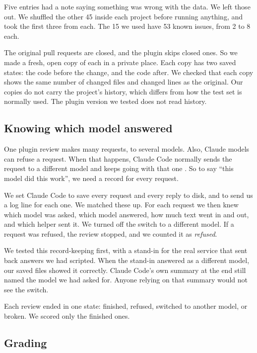 \documentclass[11pt]{article}
\begin{document}
Five entries had a note saying something was wrong with the data. We left those out. We shuffled the other 45 inside each project before running anything, and took the first three from each. The 15 we used have 53 known issues, from 2 to 8 each.

The original pull requests are closed, and the plugin skips closed ones. So we made a fresh, open copy of each in a private place. Each copy has two saved states: the code before the change, and the code after. We checked that each copy shows the same number of changed files and changed lines as the original. Our copies do not carry the project's history, which differs from how the test set is normally used. The plugin version we tested does not read history.

\subsection{Knowing which model answered}

One plugin review makes many requests, to several models. Also, Claude models can refuse a request. When that happens, Claude Code normally sends the request to a different model and keeps going with that one \citep{anthropic2026refusals,anthropic2026modelconfig}. So to say ``this model did this work'', we need a record for every request.

We set Claude Code to save every request and every reply to disk, and to send us a log line for each one. We matched these up. For each request we then knew which model was asked, which model answered, how much text went in and out, and which helper sent it. We turned off the switch to a different model. If a request was refused, the review stopped, and we counted it as \emph{refused}.

We tested this record-keeping first, with a stand-in for the real service that sent back answers we had scripted. When the stand-in answered as a different model, our saved files showed it correctly. Claude Code's own summary at the end still named the model we had asked for. Anyone relying on that summary would not see the switch.

Each review ended in one state: finished, refused, switched to another model, or broken. We scored only the finished ones.

\subsection{Grading}
\end{document}
